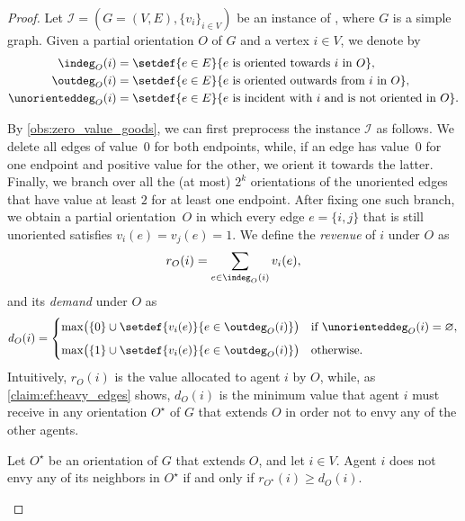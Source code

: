 \documentclass[11pt,letterpaper]{article}
\begin{document}
\begin{proof}
    Let $\mathcal{I} = (G=(V,E),\{v_i\}_{i \in V})$ be an instance of \EFo, where $G$ is a simple graph.
    Given a partial orientation $O$ of $G$ and a vertex $i \in V$, we denote by
    \begin{align*}
        \indeg_O(i) &= \setdef{ e \in E }{ e \text{ is oriented towards } i \text{ in } O },\\
        \outdeg_O(i) &= \setdef{ e \in E }{ e \text{ is oriented outwards from } i \text{ in } O },\\
        \unorienteddeg_O(i) &= \setdef{ e \in E }{ e \text{ is incident with } i \text{ and is not oriented in } O }.
    \end{align*}


    By \cref{obs:zero_value_goods}, we can first preprocess the instance $\mathcal{I}$ as follows.
    We delete all edges of value~$0$ for both endpoints, while,
    if an edge has value~$0$ for one endpoint and positive value for the other,
    we orient it towards the latter.
    Finally, we branch over all the (at most) $2^k$ orientations of the unoriented edges that have value at least $2$ for at least one endpoint.
    After fixing one such branch, we obtain a partial orientation~$O$ in which
    every edge $e = \{i,j\}$ that is still unoriented satisfies $v_i(e) = v_j(e) = 1$.
    We define the \emph{revenue} of $i$ under $O$ as
    \[
        r_O(i) = \sum_{e \in \indeg_O(i)} v_i(e),
    \]
    and its \emph{demand} under $O$ as
    \[
        d_O(i) =
        \begin{cases}
            \max\bigl( \{0\} \cup \setdef{ v_i(e) }{ e \in \outdeg_O(i) } \bigr)
                & \text{if } \unorienteddeg_O(i) = \varnothing,\\[2mm]

            \max\bigl( \{1\} \cup \setdef{ v_i(e) }{ e \in \outdeg_O(i) } \bigr)
                & \text{otherwise.}
        \end{cases}
    \]
    Intuitively, $r_O(i)$ is the value allocated to agent $i$ by $O$,
    while, as \cref{claim:ef:heavy_edges} shows, $d_O(i)$ is the minimum value that agent $i$ must receive in any orientation $O^\star$ of $G$ that extends $O$
    in order not to envy any of the other agents.

    \begin{claim}\label{claim:ef:heavy_edges}
        Let $O^\star$ be an orientation of $G$ that extends $O$, and let $i \in V$.
        Agent $i$ does not envy any of its neighbors in $O^\star$ if and only if $r_{O^\star}(i) \ge d_{O}(i)$.
    \end{claim}


\end{proof}
\end{document}
